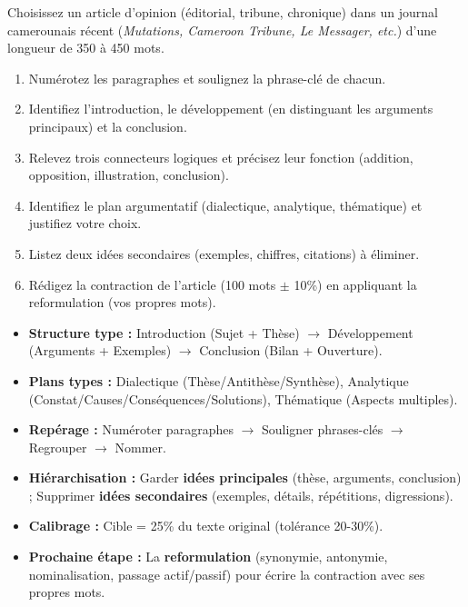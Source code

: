 \documentclass[11pt]{article}
\begin{document}
\begin{exercice}
Choisissez un article d'opinion (éditorial, tribune, chronique) dans un journal camerounais récent (\emph{Mutations, Cameroon Tribune, Le Messager, etc.}) d'une longueur de 350 à 450 mots.
\begin{enumerate}
\item Numérotez les paragraphes et soulignez la phrase-clé de chacun.
\item Identifiez l'introduction, le développement (en distinguant les arguments principaux) et la conclusion.
\item Relevez trois connecteurs logiques et précisez leur fonction (addition, opposition, illustration, conclusion).
\item Identifiez le plan argumentatif (dialectique, analytique, thématique) et justifiez votre choix.
\item Listez deux idées secondaires (exemples, chiffres, citations) à éliminer.
\item Rédigez la contraction de l'article (100 mots $\pm$ 10\%) en appliquant la reformulation (vos propres mots).
\end{enumerate}
\end{exercice}

\begin{aretenir}
\begin{itemize}
\item \textbf{Structure type :} Introduction (Sujet + Thèse) $\rightarrow$ Développement (Arguments + Exemples) $\rightarrow$ Conclusion (Bilan + Ouverture).
\item \textbf{Plans types :} Dialectique (Thèse/Antithèse/Synthèse), Analytique (Constat/Causes/Conséquences/Solutions), Thématique (Aspects multiples).
\item \textbf{Repérage :} Numéroter paragraphes $\rightarrow$ Souligner phrases-clés $\rightarrow$ Regrouper $\rightarrow$ Nommer.
\item \textbf{Hiérarchisation :} Garder \textbf{idées principales} (thèse, arguments, conclusion) ; Supprimer \textbf{idées secondaires} (exemples, détails, répétitions, digressions).
\item \textbf{Calibrage :} Cible = 25\% du texte original (tolérance 20-30\%).
\item \textbf{Prochaine étape :} La \textbf{reformulation} (synonymie, antonymie, nominalisation, passage actif/passif) pour écrire la contraction avec ses propres mots.
\end{itemize}
\end{aretenir}
\end{document}
